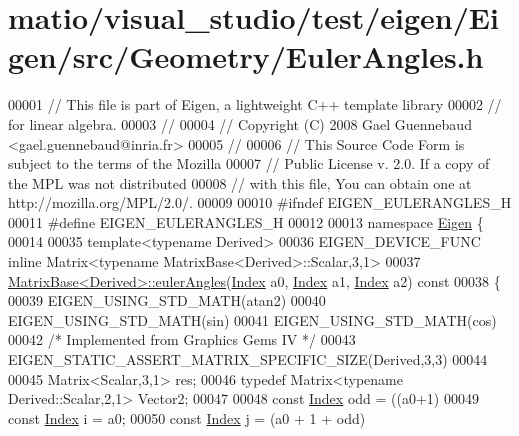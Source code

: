 \hypertarget{matio_2visual__studio_2test_2eigen_2_eigen_2src_2_geometry_2_euler_angles_8h_source}{}\section{matio/visual\+\_\+studio/test/eigen/\+Eigen/src/\+Geometry/\+Euler\+Angles.h}
\label{matio_2visual__studio_2test_2eigen_2_eigen_2src_2_geometry_2_euler_angles_8h_source}

\begin{DoxyCode}
00001 \textcolor{comment}{// This file is part of Eigen, a lightweight C++ template library}
00002 \textcolor{comment}{// for linear algebra.}
00003 \textcolor{comment}{//}
00004 \textcolor{comment}{// Copyright (C) 2008 Gael Guennebaud <gael.guennebaud@inria.fr>}
00005 \textcolor{comment}{//}
00006 \textcolor{comment}{// This Source Code Form is subject to the terms of the Mozilla}
00007 \textcolor{comment}{// Public License v. 2.0. If a copy of the MPL was not distributed}
00008 \textcolor{comment}{// with this file, You can obtain one at http://mozilla.org/MPL/2.0/.}
00009 
00010 \textcolor{preprocessor}{#ifndef EIGEN\_EULERANGLES\_H}
00011 \textcolor{preprocessor}{#define EIGEN\_EULERANGLES\_H}
00012 
00013 \textcolor{keyword}{namespace }\hyperlink{namespace_eigen}{Eigen} \{ 
00014 
00035 \textcolor{keyword}{template}<\textcolor{keyword}{typename} Derived>
00036 EIGEN\_DEVICE\_FUNC \textcolor{keyword}{inline} Matrix<typename MatrixBase<Derived>::Scalar,3,1>
00037 \hyperlink{group___geometry___module_ga24e8dc29689f0075ba5b1f90c02b76dc}{MatrixBase<Derived>::eulerAngles}(\hyperlink{namespace_eigen_a62e77e0933482dafde8fe197d9a2cfde}{Index} a0, 
      \hyperlink{namespace_eigen_a62e77e0933482dafde8fe197d9a2cfde}{Index} a1, \hyperlink{namespace_eigen_a62e77e0933482dafde8fe197d9a2cfde}{Index} a2)\textcolor{keyword}{ const}
00038 \textcolor{keyword}{}\{
00039   EIGEN\_USING\_STD\_MATH(atan2)
00040   EIGEN\_USING\_STD\_MATH(sin)
00041   EIGEN\_USING\_STD\_MATH(cos)
00042   \textcolor{comment}{/* Implemented from Graphics Gems IV */}
00043   EIGEN\_STATIC\_ASSERT\_MATRIX\_SPECIFIC\_SIZE(Derived,3,3)
00044 
00045   Matrix<Scalar,3,1> res;
00046   typedef Matrix<typename Derived::Scalar,2,1> Vector2;
00047 
00048   const \hyperlink{namespace_eigen_a62e77e0933482dafde8fe197d9a2cfde}{Index} odd = ((a0+1)%
00049   const \hyperlink{namespace_eigen_a62e77e0933482dafde8fe197d9a2cfde}{Index} i = a0;
00050   const \hyperlink{namespace_eigen_a62e77e0933482dafde8fe197d9a2cfde}{Index} j = (a0 + 1 + odd)%

\end{DoxyCode}
